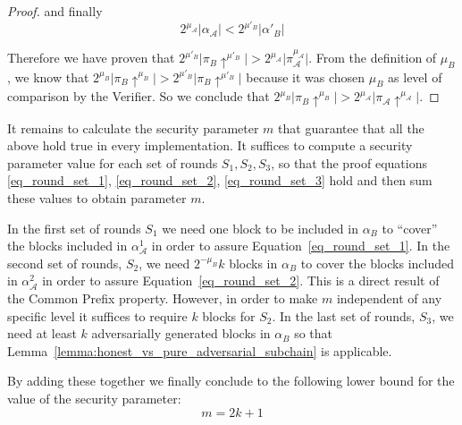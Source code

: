 \begin{proof}
	and finally
	\begin{equation}
	2^{\mu_\mathcal{A}} \vert \alpha_\mathcal{A} \vert < 2^{\mu'_B} \vert \alpha'{_B} \vert
	\end{equation}


	Therefore we have proven that $2^{\mu'_B} \vert \pi_B \uparrow^{\mu'_B} \vert >
	2^{\mu_\mathcal{A}} \vert \pi_\mathcal{A}^{\mu_\mathcal{A}} \vert$. From the definition of $\mu_B$, we know
	that $2^{\mu_B} \vert \pi_B \uparrow^{\mu_B} \vert > 2^{\mu'_B} \vert \pi_B
	\uparrow^{\mu'_B} \vert$ because it was chosen $\mu_B$ as level of comparison
	by the Verifier. So we conclude that $2^{\mu_B} \vert \pi_B \uparrow^{\mu_B}
	\vert > 2^{\mu_\mathcal{A}} \vert \pi_\mathcal{A} \uparrow^{\mu_\mathcal{A}} \vert$.

\end{proof}

It remains to calculate the security parameter $m$ that guarantee that all the above
hold true in every implementation. It suffices to compute a security parameter
value for each set of rounds $S_1, S_2, S_3$, so that the proof equations
\ref{eq_round_set_1}, \ref{eq_round_set_2}, \ref{eq_round_set_3} hold and
then sum these values to obtain parameter $m$.

In the first set of rounds $S_1$ we need
one block to be included in $\alpha_B$ to ``cover'' the blocks included in $\alpha^1_\mathcal{A}$ in order to assure Equation~\ref{eq_round_set_1}. In the second set of rounds, $S_2$, we need $2^{-\mu_B} k$ blocks in $\alpha_B$ to cover the blocks included in $\alpha^2_\mathcal{A}$ in order to assure Equation~\ref{eq_round_set_2}. This is a direct result of the Common Prefix property. However, in order to make $m$ independent
of any specific level it suffices to require $k$ blocks
for $S_2$. In the last set of rounds, $S_3$, we need at least $k$
adversarially generated blocks in $\alpha_B$ so that Lemma~\ref{lemma:honest_vs_pure_adversarial_subchain} is applicable.

By adding these together we finally conclude to the following lower bound for the value of the
security parameter:
\begin{equation}
	m = 2k + 1
\end{equation}
